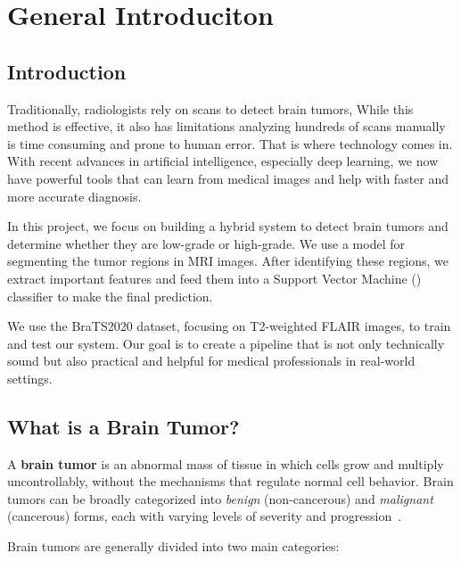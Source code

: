 \chapter{General Introduciton}

\section{Introduction}

Traditionally, radiologists rely on  scans to detect brain tumors, While this method is effective, it also has limitations analyzing hundreds of scans manually is time consuming and prone to human error. That is where technology comes in. With recent advances in artificial intelligence, especially deep learning, we now have powerful tools that can learn from medical images and help with faster and more accurate diagnosis.

In this project, we focus on building a hybrid system to detect brain tumors and determine whether they are low-grade or high-grade. We use a  model for segmenting the tumor regions in MRI images. After identifying these regions, we extract important features and feed them into a Support Vector Machine () classifier to make the final prediction.

We use the BraTS2020 dataset, focusing on T2-weighted FLAIR images, to train and test our system. Our goal is to create a pipeline that is not only technically sound but also practical and helpful for medical professionals in real-world settings.

\section{What is a Brain Tumor?}

A \textbf{brain tumor} is an abnormal mass of tissue in which cells grow and multiply uncontrollably, without the mechanisms that regulate normal cell behavior. Brain tumors can be broadly categorized into \textit{benign} (non-cancerous) and \textit{malignant} (cancerous) forms, each with varying levels of severity and progression~\cite{cancer_gov}.

Brain tumors are generally divided into two main categories:

